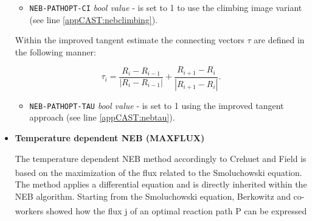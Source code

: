 \documentclass[a4paper,11pt]{scrartcl}
\newcommand{\myCite}[1]{\textsuperscript{\cite{#1}}}
\begin{document}
\begin{itemize}
\begin{itemize}

\item \texttt{NEB-PATHOPT-CI} \textit{bool value} - is set to 1 to use the climbing image variant (see line \ref{appCAST:nebclimbing}).

\end{itemize}

Within the improved tangent estimate the connecting vectors $\tau$ are defined in the following manner:

\begin{equation}
\tau_{i}=\frac{R_{i}-R_{i-1}}{\left|R_{i}-R_{i-1}\right|}+\frac{R_{i+1}-R_{i}}{\left|R_{i+1}-R_{i}\right|}.
\end{equation}

\begin{itemize}

\item \texttt{NEB-PATHOPT-TAU} \textit{bool value} - is set to 1 using the improved tangent approach (see line \ref{appCAST:nebtau}).

\end{itemize}



\item \textbf{Temperature dependent NEB (MAXFLUX)}

 The temperature dependent NEB method accordingly to Crehuet and Field  is based on the maximization of the flux related to the Smoluchowski equation\myCite{Smoluchowski1916}. The method applies a differential equation and is directly inherited within the NEB algorithm. Starting from the Smoluchowski equation, Berkowitz and co-workers\myCite{Berkowitz1983} showed how the flux j of an optimal reaction path P can be expressed
		

\end{itemize}
\end{document}
